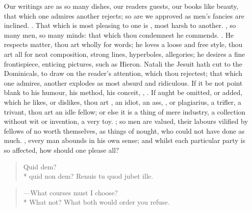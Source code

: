 {Our writings are as so many dishes, our readers guests, our books like
beauty, that which one admires another rejects; so are we approved as
men's fancies are inclined. . That which is most pleasing to one is , most
harsh to another. , so many men, so many
minds: that which thou condemnest he commends. . He respects matter, thou art wholly for
words; he loves a loose and free style, thou art all for neat
composition, strong lines, hyperboles, allegories; he desires a fine
frontispiece, enticing pictures, such as Hieron. Natali the Jesuit
hath cut to the Dominicals, to draw on the reader's attention, which
thou rejectest; that which one admires, another explodes as most absurd
and ridiculous. If it be not point blank to his humour, his method, his
conceit, , \etc. If aught be omitted, or added, which he likes, or
dislikes, thou art , an idiot, an ass, , or plagiarius, a trifler, a trivant, thou art an idle fellow; or
else it is a thing of mere industry, a collection without wit or
invention, a very toy. ; so men are valued, their
labours vilified by fellows of no worth themselves, as things of
nought, who could not have done as much. ,
every man abounds in his own sense; and whilst each particular party is
so affected, how should one please all?
%
\begin{verse}
Quid dem?\\*
quid non dem? Renuis tu quod jubet ille.
\end{verse}
\translationrule
\begin{verse}
---What courses must I choose?\\*
What not? What both would order you refuse.
\end{verse}
%

}
